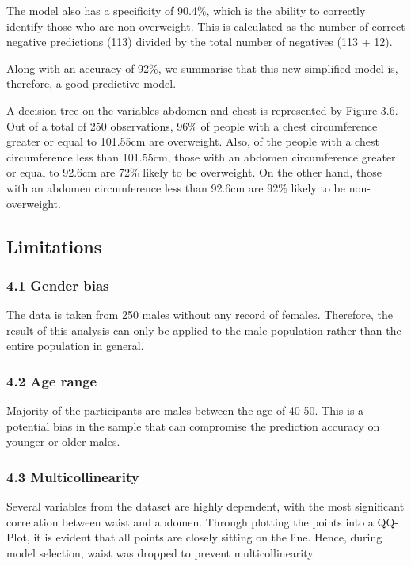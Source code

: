 \documentclass[a4paper,9pt,twocolumn,twoside,]{pinp}
\begin{document}
The model also has a specificity of 90.4\%, which is the ability to
correctly identify those who are non-overweight. This is calculated as
the number of correct negative predictions (113) divided by the total
number of negatives (113 + 12).

Along with an accuracy of 92\%, we summarise that this new simplified
model is, therefore, a good predictive model.

A decision tree on the variables abdomen and chest is represented by
Figure 3.6. Out of a total of 250 observations, 96\% of people with a
chest circumference greater or equal to 101.55cm are overweight. Also,
of the people with a chest circumference less than 101.55cm, those with
an abdomen circumference greater or equal to 92.6cm are 72\% likely to
be overweight. On the other hand, those with an abdomen circumference
less than 92.6cm are 92\% likely to be non-overweight.

\hypertarget{limitations}{%
\subsection{Limitations}\label{limitations}}

\hypertarget{gender-bias}{%
\subsubsection{4.1 Gender bias}\label{gender-bias}}

The data is taken from 250 males without any record of females.
Therefore, the result of this analysis can only be applied to the male
population rather than the entire population in general.

\hypertarget{age-range}{%
\subsubsection{4.2 Age range}\label{age-range}}

Majority of the participants are males between the age of 40-50. This is
a potential bias in the sample that can compromise the prediction
accuracy on younger or older males.

\hypertarget{multicollinearity}{%
\subsubsection{4.3 Multicollinearity}\label{multicollinearity}}

Several variables from the dataset are highly dependent, with the most
significant correlation between waist and abdomen. Through plotting the
points into a QQ-Plot, it is evident that all points are closely sitting
on the line. Hence, during model selection, waist was dropped to prevent
multicollinearity.
\end{document}
